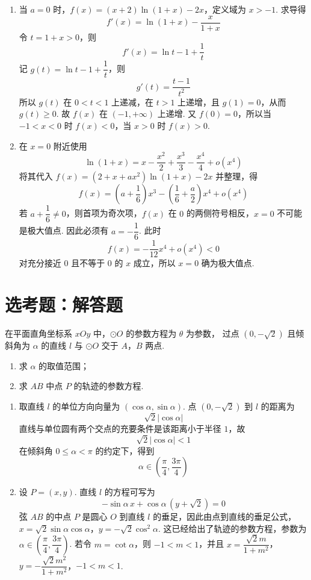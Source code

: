 \begin{solution}
\begin{enumerate}
\item 当 \(a=0\) 时，\(f(x)=(x+2)\ln(1+x)-2x\)，定义域为 \(x>-1\). 求导得
\[
f'(x)=\ln(1+x)-\dfrac{x}{1+x}
\]
令 \(t=1+x>0\)，则
\[
f'(x)=\ln t-1+\dfrac1t
\]
记 \(g(t)=\ln t-1+\dfrac1t\)，则
\[
g'(t)=\dfrac{t-1}{t^2}
\]
所以 \(g(t)\) 在 \(0<t<1\) 上递减，在 \(t>1\) 上递增，且 \(g(1)=0\)，从而 \(g(t)\ge0\). 故 \(f(x)\) 在 \((-1,+\infty)\) 上递增. 又 \(f(0)=0\)，所以当 \(-1<x<0\) 时 \(f(x)<0\)，当 \(x>0\) 时 \(f(x)>0\).
\item 在 \(x=0\) 附近使用
\[
\ln(1+x)=x-\dfrac{x^2}{2}+\dfrac{x^3}{3}-\dfrac{x^4}{4}+o(x^4)
\]
将其代入 \(f(x)=(2+x+ax^2)\ln(1+x)-2x\) 并整理，得
\[
f(x)=\left(a+\dfrac16\right)x^3-\left(\dfrac16+\dfrac a2\right)x^4+o(x^4)
\]
若 \(a+\dfrac16\ne0\)，则首项为奇次项，\(f(x)\) 在 \(0\) 的两侧符号相反，\(x=0\) 不可能是极大值点. 因此必须有 \(a=-\dfrac16\). 此时
\[
f(x)=-\dfrac1{12}x^4+o(x^4)<0
\]
对充分接近 \(0\) 且不等于 \(0\) 的 \(x\) 成立，所以 \(x=0\) 确为极大值点.
\end{enumerate}
\end{solution}

\section{选考题：解答题}

\begin{problem}
在平面直角坐标系 \(xOy\) 中，\(\odot O\) 的参数方程为
\(\theta\) 为参数，
过点 \((0,-\sqrt2)\) 且倾斜角为 \(\alpha\) 的直线 \(l\) 与 \(\odot O\) 交于 \(A\)，\(B\) 两点.

\begin{enumerate}
\item 求 \(\alpha\) 的取值范围；
\item 求 \(AB\) 中点 \(P\) 的轨迹的参数方程.
\end{enumerate}
\end{problem}

\begin{solution}
\begin{enumerate}
\item 取直线 \(l\) 的单位方向向量为 \((\cos\alpha,\sin\alpha)\). 点 \((0,-\sqrt2)\) 到 \(l\) 的距离为
\[
\sqrt2|\cos\alpha|
\]
直线与单位圆有两个交点的充要条件是该距离小于半径 \(1\)，故
\[
\sqrt2|\cos\alpha|<1
\]
在倾斜角 \(0\le\alpha<\pi\) 的约定下，得到
\[
\alpha\in\left(\dfrac\pi4,\dfrac{3\pi}4\right)
\]
\item 设 \(P=(x,y)\). 直线 \(l\) 的方程可写为
\[
-\sin\alpha\,x+\cos\alpha\,(y+\sqrt2)=0
\]
弦 \(AB\) 的中点 \(P\) 是圆心 \(O\) 到直线 \(l\) 的垂足，因此由点到直线的垂足公式，
\(x=\sqrt2\sin\alpha\cos\alpha\)，\(y=-\sqrt2\cos^2\alpha\).
这已经给出了轨迹的参数方程，参数为 \(\alpha\in\left(\dfrac\pi4,\dfrac{3\pi}4\right)\). 若令 \(m=\cot\alpha\)，则 \(-1<m<1\)，并且
\(x=\dfrac{\sqrt2m}{1+m^2}\)，\(y=-\dfrac{\sqrt2m^2}{1+m^2}\)，\(-1<m<1\).
\end{enumerate}
\end{solution}

